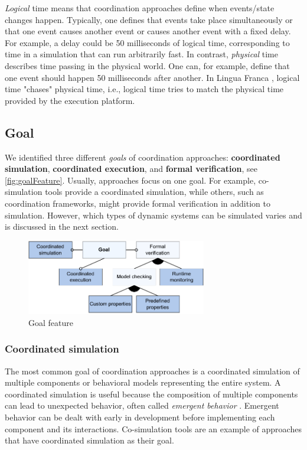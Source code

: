 \documentclass[runningheads]{llncs}
\begin{document}
\textit{Logical} time means that coordination approaches define when events/state changes happen.
Typically, one defines that events take place simultaneously or that one event causes another event or causes another event with a fixed delay.
For example, a delay could be 50 milliseconds of logical time, corresponding to time in a simulation that can run arbitrarily fast. 
In contrast, \textit{physical} time describes time passing in the physical world.
One can, for example, define that one event should happen 50 milliseconds after another.
In Lingua Franca \cite{lohstrohReactorsDeterministicModel2020}, logical time "chases" physical time, i.e., logical time tries to match the physical time provided by the execution platform.


\subsection{Goal} %
We identified three different \textit{goals} of coordination approaches: \textbf{coordinated simulation}, \textbf{coordinated execution}, and \textbf{formal verification}, see \autoref{fig:goalFeature}.
Usually, approaches focus on one goal.
For example, co-simulation tools provide a coordinated simulation, while others, such as coordination frameworks, might provide formal verification in addition to simulation.
However, which types of dynamic systems can be simulated varies and is discussed in the next section.

\begin{figure}[ht]
	\centering
	\includegraphics[width=0.7\textwidth]{images/goal_feature}
	\caption{Goal feature}
	\label{fig:goalFeature}
\end{figure}

\subsubsection{Coordinated simulation} The most common goal of coordination approaches is a coordinated simulation of multiple components or behavioral models representing the entire system.
A coordinated simulation is useful because the composition of multiple components can lead to unexpected behavior, often called \textit{emergent behavior} \cite{ekerTamingHeterogeneityPtolemy2003}.
Emergent behavior can be dealt with early in development before implementing each component and its interactions.
Co-simulation tools are an example of approaches that have coordinated simulation as their goal.
\end{document}
